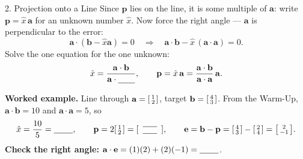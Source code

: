 \documentclass[10pt]{article}
\newcommand{\bb}{\mathbf{b}}
\newcommand{\pp}{\mathbf{p}}
\newcommand{\ee}{\mathbf{e}}
\newcommand{\avec}{\mathbf{a}}
\begin{document}
\begin{notesbox}{2. Projection onto a Line}
Since $\pp$ lies on the line, it is some multiple of $\avec$: write $\pp=\hat{x}\,\avec$ for an unknown
number $\hat{x}$. Now force the right angle --- $\avec$ is perpendicular to the error:
\[
  \avec\cdot(\bb-\hat{x}\avec)=0 \quad\Longrightarrow\quad \avec\cdot\bb-\hat{x}\,(\avec\cdot\avec)=0.
\]
Solve the one equation for the one unknown:
\[
  \hat{x}=\frac{\avec\cdot\bb}{\avec\cdot\blank{0.7cm}}, \qquad
  \pp=\hat{x}\,\avec=\frac{\avec\cdot\bb}{\avec\cdot\avec}\,\avec.
\]

\textbf{Worked example.} Line through $\avec=\begin{bsmallmatrix} 1\\2 \end{bsmallmatrix}$, target
$\bb=\begin{bsmallmatrix} 4\\3 \end{bsmallmatrix}$. From the Warm-Up, $\avec\cdot\bb=10$ and
$\avec\cdot\avec=5$, so
\[
  \hat{x}=\frac{10}{5}=\blank{0.8cm}, \qquad
  \pp=2\begin{bsmallmatrix} 1\\2 \end{bsmallmatrix}=\begin{bsmallmatrix}\ \blank{0.6cm}\ \\[2pt] \blank{0.6cm} \end{bsmallmatrix},\qquad
  \ee=\bb-\pp=\begin{bsmallmatrix} 4\\3 \end{bsmallmatrix}-\begin{bsmallmatrix} 2\\4 \end{bsmallmatrix}=\begin{bsmallmatrix} 2\\-1 \end{bsmallmatrix}.
\]
\textbf{Check the right angle:} $\avec\cdot\ee=(1)(2)+(2)(-1)=\blank{0.8cm}$. \checkmark
\end{notesbox}
\end{document}
